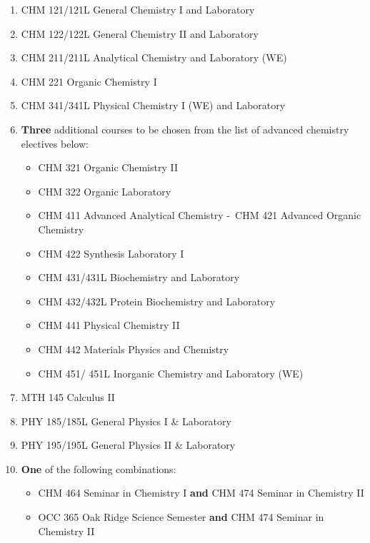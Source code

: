 \documentclass[
  letterpaper,
]{scrbook}
\providecommand{\tightlist}{%
  \setlength{\itemsep}{0pt}\setlength{\parskip}{0pt}}
\begin{document}
\begin{enumerate}
\def\labelenumi{\arabic{enumi}.}
\item
  CHM 121/121L General Chemistry I and Laboratory
\item
  CHM 122/122L General Chemistry II and Laboratory
\item
  CHM 211/211L Analytical Chemistry and Laboratory (WE)
\item
  CHM 221 Organic Chemistry I
\item
  CHM 341/341L Physical Chemistry I (WE) and Laboratory
\item
  \textbf{Three} additional courses to be chosen from the list of
  advanced chemistry electives below:

  \begin{itemize}
  \tightlist
  \item
    CHM 321 Organic Chemistry II
  \item
    CHM 322 Organic Laboratory
  \item
    CHM 411 Advanced Analytical Chemistry -~CHM 421 Advanced Organic
    Chemistry
  \item
    CHM 422 Synthesis Laboratory I
  \item
    CHM 431/431L Biochemistry and Laboratory
  \item
    CHM 432/432L Protein Biochemistry and Laboratory
  \item
    CHM 441 Physical Chemistry II
  \item
    CHM 442 Materials Physics and Chemistry
  \item
    CHM 451/ 451L Inorganic Chemistry and Laboratory (WE)
  \end{itemize}
\item
  MTH 145 Calculus II
\item
  PHY 185/185L General Physics I \& Laboratory
\item
  PHY 195/195L General Physics II \& Laboratory
\item
  \textbf{One} of the following combinations:

  \begin{itemize}
  \tightlist
  \item
    CHM 464 Seminar in Chemistry I \textbf{and} CHM 474 Seminar in
    Chemistry II
  \item
    OCC 365 Oak Ridge Science Semester \textbf{and} CHM 474 Seminar in
    Chemistry II
  \end{itemize}
\end{enumerate}
\end{document}
